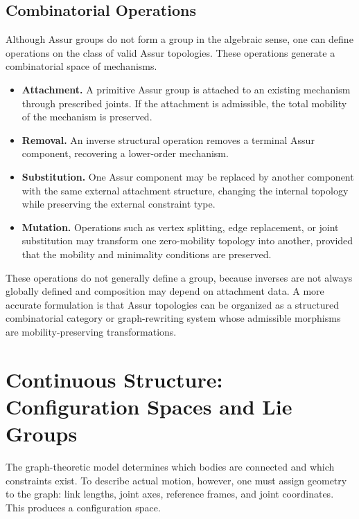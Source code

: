 \documentclass[12pt,a4paper]{article}
\begin{document}
\subsection{Combinatorial Operations}

Although Assur groups do not form a group in the algebraic sense, one can define operations on the class of valid Assur topologies. These operations generate a combinatorial space of mechanisms.

\begin{itemize}
\item \textbf{Attachment.} A primitive Assur group is attached to an existing mechanism through prescribed joints. If the attachment is admissible, the total mobility of the mechanism is preserved.

\item \textbf{Removal.} An inverse structural operation removes a terminal Assur component, recovering a lower-order mechanism.

\item \textbf{Substitution.} One Assur component may be replaced by another component with the same external attachment structure, changing the internal topology while preserving the external constraint type.

\item \textbf{Mutation.} Operations such as vertex splitting, edge replacement, or joint substitution may transform one zero-mobility topology into another, provided that the mobility and minimality conditions are preserved.

\end{itemize}

These operations do not generally define a group, because inverses are not always globally defined and composition may depend on attachment data. A more accurate formulation is that Assur topologies can be organized as a structured combinatorial category or graph-rewriting system whose admissible morphisms are mobility-preserving transformations.

\section{Continuous Structure: Configuration Spaces and Lie Groups}

The graph-theoretic model determines which bodies are connected and which constraints exist. To describe actual motion, however, one must assign geometry to the graph: link lengths, joint axes, reference frames, and joint coordinates. This produces a configuration space.
\end{document}
